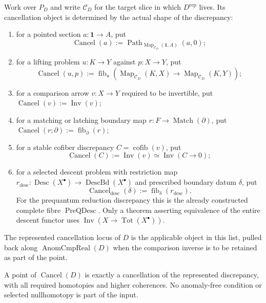 \begin{construction}
\label{constr:prequantum-typed-anomaly-cancellation}
Work over $P_D$ and write $\mathcal C_D$ for the target slice in which
$D^{\mathrm{rep}}$ lives.  Its cancellation object is determined by the actual
shape of the discrepancy:
\begin{enumerate}
\item for a pointed section $a:\mathbf1\to A$, put
      \[
      \operatorname{Cancel}(a)
      :=\operatorname{Path}_{\operatorname{Map}_{\mathcal C_D}
      (\mathbf1,A)}(a,0);
      \]
\item for a lifting problem $u:K\to Y$ against $p:X\to Y$, put
      \[
      \operatorname{Cancel}(u,p)
      :=\operatorname{fib}_{u}\!\left(
      \operatorname{Map}_{\mathcal C_D}(K,X)\to
      \operatorname{Map}_{\mathcal C_D}(K,Y)
      \right);
      \]
\item for a comparison arrow $v:X\to Y$ required to be invertible, put
      $\operatorname{Cancel}(v):=\operatorname{Inv}(v)$;
\item for a matching or latching boundary map
      $r:F\to\operatorname{Match}(\partial)$, put
      $\operatorname{Cancel}(r;\partial):=\operatorname{fib}_{\partial}(r)$;
\item for a stable cofiber discrepancy $C=\operatorname{cofib}(v)$, put
      \[
      \operatorname{Cancel}(C)
      :=\operatorname{Inv}(v)
      \simeq
      \operatorname{Inv}(C\to0);
      \]
\item for a selected descent problem with restriction map
      $r_{\mathrm{desc}}:\operatorname{Desc}(X^\bullet)\to
      \operatorname{DescBd}(X^\bullet)$ and prescribed boundary datum $\delta$,
      put
      \[
      \operatorname{Cancel}_{\mathrm{desc}}(\delta)
      :=\operatorname{fib}_{\delta}(r_{\mathrm{desc}}).
      \]
      For the prequantum reduction discrepancy this is the already constructed
      complete fibre $\operatorname{PreQDesc}$.  Only a theorem asserting
      equivalence of the entire descent functor uses
      $\operatorname{Inv}(X\to\operatorname{Tot}(X^\bullet))$.
\end{enumerate}
The represented cancellation locus of $D$ is the applicable object in this
list, pulled back along $\operatorname{AnomCmpReal}(D)$ when the comparison
inverse is to be retained as part of the point.
\end{construction}

\begin{proposition}
\label{prop:prequantum-anomaly-cancellation-universal-property}
A point of $\operatorname{Cancel}(D)$ is exactly a cancellation of the
represented discrepancy, with all required homotopies and higher coherences.
No anomaly-free condition or selected nullhomotopy is part of the input.
\end{proposition}

